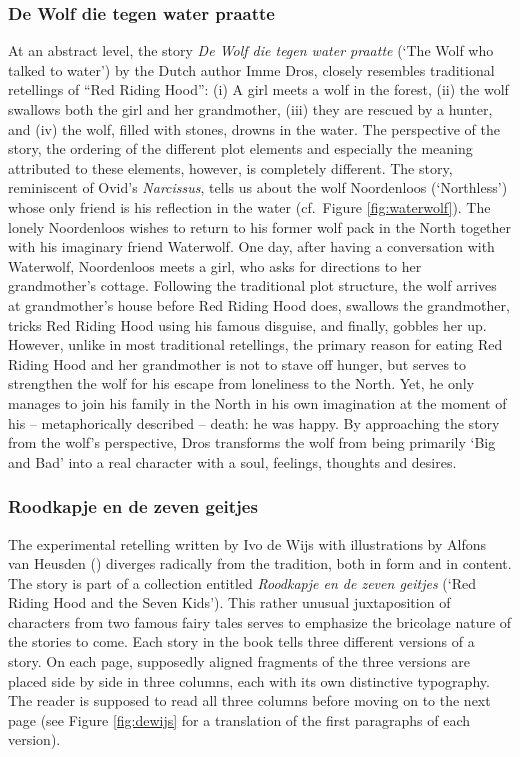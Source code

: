 \subsubsection*{De Wolf die tegen water praatte}
At an abstract level, the story \emph{De Wolf die tegen water praatte} (`The Wolf who talked to water') by the Dutch author Imme Dros, closely resembles traditional retellings of ``Red Riding Hood'': (i) A girl meets a wolf in the forest, (ii) the wolf swallows both the girl and her grandmother, (iii) they are rescued by a hunter, and (iv) the wolf, filled with stones, drowns in the water\autocite{dros:1991}. The perspective of the story, the ordering of the different plot elements and especially the meaning attributed to these elements, however, is completely different. The story, reminiscent of Ovid's \emph{Narcissus}, tells us about the wolf Noordenloos (`Northless') whose only friend is his reflection in the water (cf.\ Figure \ref{fig:waterwolf}). The lonely Noordenloos wishes to return to his former wolf pack in the North together with his imaginary friend Waterwolf. One day, after having a conversation with Waterwolf, Noordenloos meets a girl, who asks for directions to her grandmother's cottage. Following the traditional plot structure, the wolf arrives at grandmother's house before Red Riding Hood does, swallows the grandmother, tricks Red Riding Hood using his famous disguise, and finally, gobbles her up. However, unlike in most traditional retellings, the primary reason for eating Red Riding Hood and her grandmother is not to stave off hunger, but serves to strengthen the wolf for his escape from loneliness to the North. Yet, he only manages to join his family in the North in his own imagination at the moment of his -- metaphorically described -- death: he was happy. By approaching the story from the wolf's perspective, Dros transforms the wolf from being primarily `Big and Bad' into a real character with a soul, feelings, thoughts and desires. 

\subsubsection*{Roodkapje en de zeven geitjes}

The experimental retelling written by Ivo de Wijs with illustrations by Alfons van Heusden (\citeyear{wijs:1994}) diverges radically from the tradition, both in form and in content. The story is part of a collection entitled \emph{Roodkapje en de zeven geitjes} (`Red Riding Hood and the Seven Kids'). This rather unusual juxtaposition of characters from two famous fairy tales serves to emphasize the bricolage nature of the stories to come. Each story in the book tells three different versions of a story. On each page, supposedly aligned fragments of the three versions are placed side by side in three columns, each with its own distinctive typography. The reader is supposed to read all three columns before moving on to the next page (see Figure \ref{fig:dewijs} for a translation of the first paragraphs of each version).

